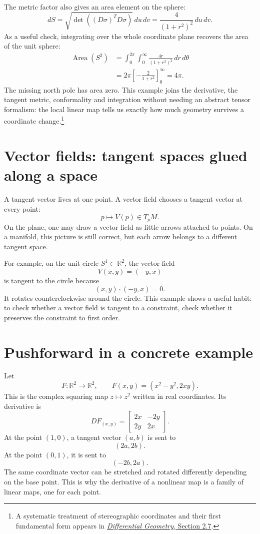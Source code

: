 The metric factor also gives an area element on the sphere:
\[
 dS=\sqrt{\det((D\sigma)^TD\sigma)}\,du\,dv
 =\frac{4}{(1+r^2)^2}\,du\,dv.
\]
As a useful check, integrating over the whole coordinate plane recovers the area of the unit sphere:
\[
 \begin{aligned}
 \operatorname{Area}(S^2)
 &=\int_0^{2\pi}\!\int_0^\infty
   \frac{4r}{(1+r^2)^2}\,dr\,d\theta\\
 &=2\pi\left[-\frac{2}{1+r^2}\right]_{0}^{\infty}
 =4\pi.
 \end{aligned}
\]
The missing north pole has area zero. This example joins the derivative, the tangent metric, conformality and integration without needing an abstract tensor formalism: the local linear map tells us exactly how much geometry survives a coordinate change.\footnote{A systematic treatment of stereographic coordinates and their first fundamental form appears in \href{https://scholarworks.iu.edu/dspace/bitstreams/d56d20ba-d997-499b-a2d0-7f1916d29048/download}{\emph{Differential Geometry}, Section 2.7}.}

\section{Vector fields: tangent spaces glued along a space}

A tangent vector lives at one point.  A vector field chooses a tangent vector at every point:
\[
  p\longmapsto V(p)\in T_pM.
\]
On the plane, one may draw a vector field as little arrows attached to points.  On a manifold, this picture is still correct, but each arrow belongs to a different tangent space.

For example, on the unit circle \(S^1\subset\mathbb R^2\), the vector field
\[
  V(x,y)=(-y,x)
\]
is tangent to the circle because
\[
  (x,y)\cdot(-y,x)=0.
\]
It rotates counterclockwise around the circle.  This example shows a useful habit: to check whether a vector field is tangent to a constraint, check whether it preserves the constraint to first order.

\section{Pushforward in a concrete example}

Let
\[
  F:\mathbb R^2\to\mathbb R^2,\qquad F(x,y)=(x^2-y^2,2xy).
\]
This is the complex squaring map \(z\mapsto z^2\) written in real coordinates.  Its derivative is
\[
  DF_{(x,y)}=\begin{bmatrix}2x&-2y\\2y&2x\end{bmatrix}.
\]
At the point \((1,0)\), a tangent vector \((a,b)\) is sent to
\[
  (2a,2b).
\]
At the point \((0,1)\), it is sent to
\[
  (-2b,2a).
\]
The same coordinate vector can be stretched and rotated differently depending on the base point.  This is why the derivative of a nonlinear map is a family of linear maps, one for each point.

